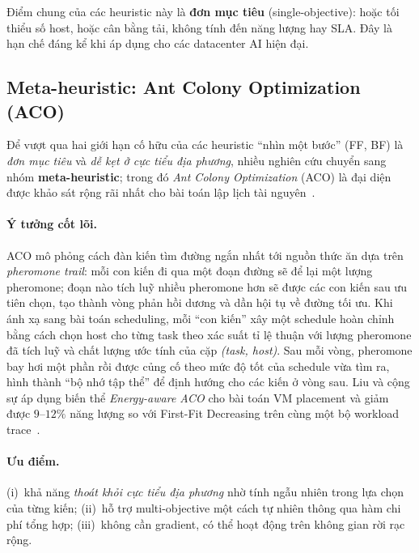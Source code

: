 Điểm chung của các heuristic này là \textbf{đơn mục tiêu}
(single-objective): hoặc tối thiểu số host, hoặc cân bằng tải, không tính
đến năng lượng hay SLA. Đây là hạn chế đáng kể khi áp dụng cho các
datacenter AI hiện đại.

\subsection{Meta-heuristic: Ant Colony Optimization (ACO)}
\label{ssec:aco}

Để vượt qua hai giới hạn cố hữu của các heuristic ``nhìn một bước''
(FF, BF) là \emph{đơn mục tiêu} và \emph{dễ kẹt ở cực tiểu địa
phương}, nhiều nghiên cứu chuyển sang nhóm \textbf{meta-heuristic};
trong đó \textit{Ant Colony Optimization} (ACO) là đại diện được khảo
sát rộng rãi nhất cho bài toán lập lịch tài
nguyên~\cite{dorigo1996ant}.

\paragraph{Ý tưởng cốt lõi.} ACO mô phỏng cách đàn kiến tìm đường ngắn
nhất tới nguồn thức ăn dựa trên \emph{pheromone trail}: mỗi con kiến đi
qua một đoạn đường sẽ để lại một lượng pheromone; đoạn nào tích luỹ
nhiều pheromone hơn sẽ được các con kiến sau ưu tiên chọn, tạo thành
vòng phản hồi dương và dần hội tụ về đường tối ưu. Khi ánh xạ sang bài
toán scheduling, mỗi ``con kiến'' xây một schedule hoàn chỉnh bằng
cách chọn host cho từng task theo xác suất tỉ lệ thuận với lượng
pheromone đã tích luỹ và chất lượng ước tính của cặp
\textit{(task, host)}. Sau mỗi vòng, pheromone bay hơi một phần rồi
được củng cố theo mức độ tốt của schedule vừa tìm ra, hình thành ``bộ
nhớ tập thể'' để định hướng cho các kiến ở vòng sau. Liu và cộng sự áp
dụng biến thể \textit{Energy-aware ACO} cho bài toán VM placement và
giảm được $9$--$12\%$ năng lượng so với First-Fit Decreasing trên cùng
một bộ workload trace~\cite{liu2014adaptive}.

\paragraph{Ưu điểm.} (i)~khả năng \emph{thoát khỏi cực tiểu địa phương}
nhờ tính ngẫu nhiên trong lựa chọn của từng kiến; (ii)~hỗ trợ
multi-objective một cách tự nhiên thông qua hàm chi phí tổng hợp;
(iii)~không cần gradient, có thể hoạt động trên không gian rời rạc
rộng.

